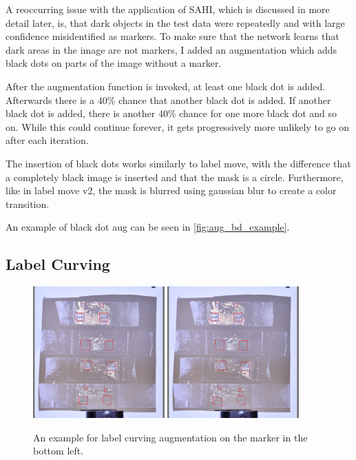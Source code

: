 \documentclass[10pt]{book}
\newcommand{\figureref}[1]{\autoref{#1}}
\begin{document}
A reoccurring issue with the application of \ac{SAHI}, which is discussed in more detail later, is, that dark objects in the test data were repeatedly and with large confidence misidentified as markers. To make sure that the network learns that dark areas in the image are not markers, I added an augmentation which adds black dots on parts of the image without a marker. 

After the augmentation function is invoked, at least one black dot is added. Afterwards there is a 40\% chance that another black dot is added. If another black dot is added, there is another 40\% chance for one more black dot and so on. While this could continue forever, it gets progressively more unlikely to go on after each iteration. 

The insertion of black dots works similarly to label move, with the difference that a completely black image is inserted and that the mask is a circle. Furthermore, like in label move v2, the mask is blurred using gaussian blur to create a color transition.

An example of black dot aug can be seen in \figureref{fig:aug_bd_example}.

\subsection{Label Curving}
\label{sec:label_curving}

\begin{figure}
  \centering
     {\includegraphics[width=0.45\textwidth]{image/aug_lc_before}}
     {\includegraphics[width=0.45\textwidth]{image/aug_lc_after}}
  \caption{An example for label curving augmentation on the marker in the bottom left.}
  \label{fig:aug_lc_example}
\end{figure}
\end{document}
